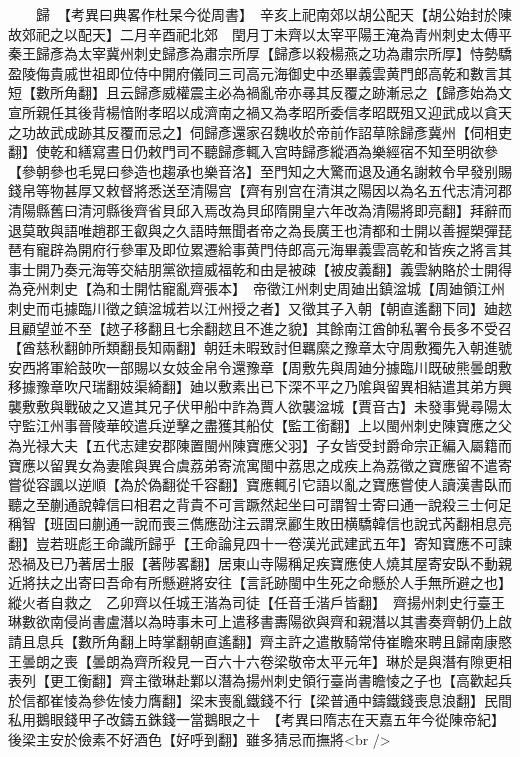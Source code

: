 　　歸　【考異曰典畧作杜杲今從周書】　辛亥上祀南郊以胡公配天【胡公始封於陳故郊祀之以配天】二月辛酉祀北郊　閏月丁未齊以太宰平陽王淹為青州刺史太傅平秦王歸彥為太宰冀州刺史歸彥為肅宗所厚【歸彥以殺楊燕之功為肅宗所厚】恃勢驕盈陵侮貴戚世祖即位侍中開府儀同三司高元海御史中丞畢義雲黄門郎高乾和數言其短【數所角翻】且云歸彥威權震主必為禍亂帝亦㝷其反覆之跡漸忌之【歸彥始為文宣所親任其後背楊愔附孝昭以成濟南之禍又為孝昭所委信孝昭既殂又迎武成以貪天之功故武成跡其反覆而忌之】伺歸彥還家召魏收於帝前作詔草除歸彥冀州【伺相吏翻】使乾和繕寫晝日仍敕門司不聽歸彥輒入宫時歸彥縱酒為樂經宿不知至明欲參【參朝參也毛晃曰參造也趨承也樂音洛】至門知之大驚而退及通名謝敕令早發别賜錢帛等物甚厚又敕督將悉送至清陽宫【齊有别宫在清淇之陽因以為名五代志清河郡清陽縣舊曰清河縣後齊省貝邱入焉改為貝邱隋開皇六年改為清陽將即亮翻】拜辭而退莫敢與語唯趙郡王叡與之久語時無聞者帝之為長廣王也清都和士開以善握槊彈琵琶有寵辟為開府行參軍及即位累遷給事黄門侍郎高元海畢義雲高乾和皆疾之將言其事士開乃奏元海等交結朋黨欲擅威福乾和由是被疎【被皮義翻】義雲納賂於士開得為兗州刺史【為和士開怙寵亂齊張本】　帝徵江州刺史周廸出鎮湓城【周廸領江州刺史而屯據臨川徵之鎮湓城若以江州授之者】又徵其子入朝【朝直遙翻下同】廸趑且顧望並不至【趑子移翻且七余翻趑且不進之貌】其餘南江酋帥私署令長多不受召【酋慈秋翻帥所類翻長知兩翻】朝廷未暇致討但羈縻之豫章太守周敷獨先入朝進號安西將軍給鼓吹一部賜以女妓金帛令還豫章【周敷先與周廸分據臨川既破熊曇朗敷移據豫章吹尺瑞翻妓渠綺翻】廸以敷素出已下深不平之乃隂與留異相結遣其弟方興襲敷敷與戰破之又遣其兄子伏甲船中詐為賈人欲襲湓城【賈音古】未發事覺尋陽太守監江州事晉陵華皎遣兵逆擊之盡獲其船仗【監工銜翻】上以閩州刺史陳寶應之父為光禄大夫【五代志建安郡陳置閩州陳寶應父羽】子女皆受封爵命宗正編入屬籍而寶應以留異女為妻隂與異合虞荔弟寄流寓閩中荔思之成疾上為荔徵之寶應留不遣寄嘗從容諷以逆順【為於偽翻從千容翻】寶應輒引它語以亂之寶應嘗使人讀漢書臥而聽之至蒯通說韓信曰相君之背貴不可言蹶然起坐曰可謂智士寄曰通一說殺三士何足稱智【班固曰蒯通一說而喪三儁應劭注云謂烹酈生敗田横驕韓信也說式芮翻相息亮翻】豈若班彪王命識所歸乎【王命論見四十一卷漢光武建武五年】寄知寶應不可諫恐禍及已乃著居士服【著陟畧翻】居東山寺陽稱足疾寶應使人燒其屋寄安臥不動親近將扶之出寄曰吾命有所懸避將安往【言託跡閩中生死之命懸於人手無所避之也】縱火者自救之　乙卯齊以任城王湝為司徒【任音壬湝戶皆翻】　齊揚州刺史行臺王琳數欲南侵尚書盧潛以為時事未可上遣移書夀陽欲與齊和親潛以其書奏齊朝仍上啟請且息兵【數所角翻上時掌翻朝直遙翻】齊主許之遣散騎常侍崔瞻來聘且歸南康愍王曇朗之喪【曇朗為齊所殺見一百六十六卷梁敬帝太平元年】琳於是與潛有隙更相表列【更工衡翻】齊主徵琳赴鄴以潛為揚州刺史領行臺尚書瞻㥄之子也【高歡起兵於信都崔㥄為參佐㥄力膺翻】梁末喪亂鐵錢不行【梁普通中鑄鐵錢喪息浪翻】民間私用鵝眼錢甲子改鑄五銖錢一當鵝眼之十　【考異曰隋志在天嘉五年今從陳帝紀】後梁主安於儉素不好酒色【好呼到翻】雖多猜忌而撫將<br />

